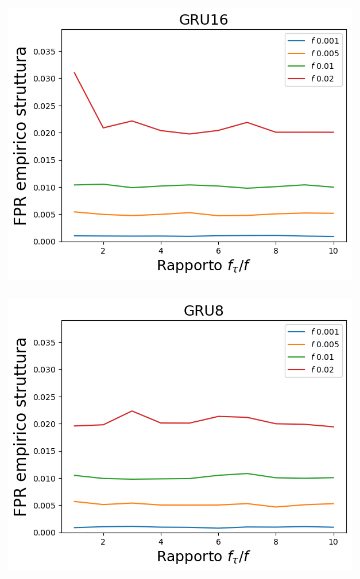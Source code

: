 \documentclass[../../main.tex]{subfiles}
\begin{document}
    \begin{figure}[H]
        \centering
        \begin{subfigure}[b]{0.49\textwidth}
            \centering
            \includegraphics[width = \textwidth]{immagini/7/SLBF/GRU16_FPR.png}
            \caption{}
            \label{fig:SLBFFPR_GRU16}
        \end{subfigure}
        \begin{subfigure}[b]{0.49\textwidth}
            \centering
            \includegraphics[width = \textwidth]{immagini/7/SLBF/GRU8_FPR.png}
            \caption{}
            \label{fig:SLBFFPR_GRU8}
        \end{subfigure}

\end{figure}
\end{document}
